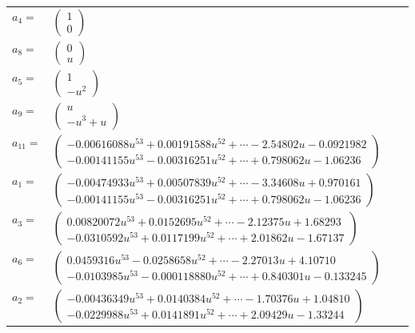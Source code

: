 \documentclass[1p]{elsarticle_modified}
\theoremstyle{definition}
\begin{document}
\begin{tabular}{m{7pt} m{180pt} m{7pt} m{180pt} }
\flushright $a_{4}=$&$\begin{pmatrix}1\\0\end{pmatrix}$ \\
\flushright $a_{8}=$&$\begin{pmatrix}0\\u\end{pmatrix}$ \\
\flushright $a_{5}=$&$\begin{pmatrix}1\\- u^2\end{pmatrix}$ \\
\flushright $a_{9}=$&$\begin{pmatrix}u\\- u^3+u\end{pmatrix}$ \\
\flushright $a_{11}=$&$\begin{pmatrix}-0.00616088 u^{53}+0.00191588 u^{52}+\cdots-2.54802 u-0.0921982\\-0.00141155 u^{53}-0.00316251 u^{52}+\cdots+0.798062 u-1.06236\end{pmatrix}$ \\
\flushright $a_{1}=$&$\begin{pmatrix}-0.00474933 u^{53}+0.00507839 u^{52}+\cdots-3.34608 u+0.970161\\-0.00141155 u^{53}-0.00316251 u^{52}+\cdots+0.798062 u-1.06236\end{pmatrix}$ \\
\flushright $a_{3}=$&$\begin{pmatrix}0.00820072 u^{53}+0.0152695 u^{52}+\cdots-2.12375 u+1.68293\\-0.0310592 u^{53}+0.0117199 u^{52}+\cdots+2.01862 u-1.67137\end{pmatrix}$ \\
\flushright $a_{6}=$&$\begin{pmatrix}0.0459316 u^{53}-0.0258658 u^{52}+\cdots-2.27013 u+4.10710\\-0.0103985 u^{53}-0.000118880 u^{52}+\cdots+0.840301 u-0.133245\end{pmatrix}$ \\
\flushright $a_{2}=$&$\begin{pmatrix}-0.00436349 u^{53}+0.0140384 u^{52}+\cdots-1.70376 u+1.04810\\-0.0229988 u^{53}+0.0141891 u^{52}+\cdots+2.09429 u-1.33244\end{pmatrix}$ \\

\end{tabular}
\end{document}
